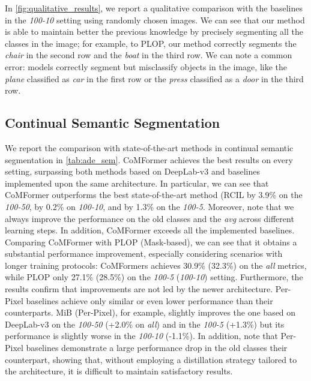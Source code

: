 \documentclass[10pt,twocolumn,letterpaper]{article}
\begin{document}
In \cref{fig:qualitative_results}, we report a qualitative comparison with the baselines in the \textit{100-10} setting using randomly chosen images. We can see that our method is able to maintain better the previous knowledge by precisely segmenting all the classes in the image; for example, \wrt to PLOP, our method correctly segments the \textit{chair} in the second row and the \textit{boat} in the third row. We can note a common error: models correctly segment but misclassify objects in the image, like the \textit{plane} classified as \textit{car} in the first row or the \textit{press} classified as a \textit{door} in the third row. 

\subsection{Continual Semantic Segmentation} 
We report the comparison with state-of-the-art methods in continual semantic segmentation in \cref{tab:ade_sem}. 
CoMFormer achieves the best results on every setting, surpassing both methods based on DeepLab-v3 \cite{chen2017deeplabv3} and baselines implemented upon the same architecture. In particular, we can see that CoMFormer outperforms the best state-of-the-art method (RCIL \cite{zhang2022rcil} by 3.9\% on the \textit{100-50}, by 0.2\% on \textit{100-10}, and by 1.3\% on the \textit{100-5}. Moreover, note that we always improve the performance on the old classes and the \textit{avg} across different learning steps. 
In addition, CoMFormer exceeds all the implemented baselines. Comparing CoMFormer with PLOP (Mask-based), we can see that it obtains a substantial performance improvement, especially considering scenarios with longer training protocols: CoMFormers achieves 30.9\% (32.3\%) on the \textit{all} metrics, while PLOP only 27.1\% (28.5\%) on the \textit{100-5} (\textit{100-10}) setting.
Furthermore, the results confirm that improvements are not led by the newer architecture. Per-Pixel baselines achieve only similar or even lower performance than their counterparts. MiB (Per-Pixel), for example, slightly improves the one based on DeepLab-v3 on the \textit{100-50} (+2.0\% on \textit{all}) and in the \textit{100-5} (+1.3\%) but its performance is slightly worse in the \textit{100-10} (-1.1\%). In addition, note that Per-Pixel baselines demonstrate a large performance drop in the old classes \wrt their counterpart, showing that, without employing a distillation strategy tailored to the architecture, it is difficult to maintain satisfactory results.
\end{document}
